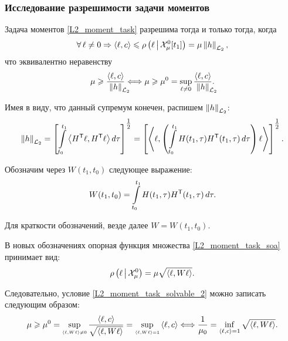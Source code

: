\subsubsection{Исследование разрешимости задачи моментов}

Задача моментов \eqref{L2_moment_task} разрешима тогда и только тогда, когда
\begin{equation}
\label{L2_moment_task_solvable_1}
  \forall \ell \neq 0 \Rightarrow
  \scalar{\ell}{c} \leqslant \sufu{\ell}{\soa_\mu^0[t_1]} =
  \mu \norm{h}_\LTwo,
\end{equation}
что эквивалентно неравенству
\begin{equation}
\label{L2_moment_task_solvable_2}
  \mu \geqslant
    \frac{\scalar{\ell}{c}}{\lefteqn{\norm{h}_\LTwo}\phantom{\norm{u}}} \Longleftrightarrow
  \mu \geqslant \mu^0 = \sup\limits_{\ell \neq 0}
    \frac{\scalar{\ell}{c}}{\lefteqn{\norm{h}_\LTwo}\phantom{\norm{u}}}.
\end{equation}

Имея в виду, что данный супремум конечен, распишем $\left\| h \right\|_{\mathcal{L}_2}$:
\begin{equation*}
	\left\| h \right\|_{\mathcal{L}_2} =
	\left[
	  \int\limits_{t_0}^{t_1} \left<H^{\mathsf{T}} \ell,H^{\mathsf{T}} \ell\right> d\tau
	\right]^{\tfrac{1}{2}} =
	\left[
	  \left<\ell,\left(
	    \int\limits_{t_0}^{t_1}H(t_1, \tau) H^{\mathsf{T}}(t_1, \tau) \, d\tau
	  \right) \ell\right>
	\right]^{\tfrac{1}{2}}.
\end{equation*}

Обозначим через $W(t_1, t_0)$ следующее выражение:
\begin{equation*}
	W(t_1, t_0) = \int\limits_{t_0}^{t_1} H(t_1, \tau) H^{\mathsf{T}}(t_1, \tau) \, d\tau.
\end{equation*}

\begin{note}
  Для краткости обозначений, везде далее $W = W(t_1, t_0)$.
\end{note}

В новых обозначениях опорная функция множества \eqref{L2_moment_task_soa} принимает вид:
\begin{equation}
\label{L2_moment_sufu_soa}
  \rho\left(\ell\,\middle|\,\mathcal{X}_\mu^0\right) = \mu \sqrt{\left<\ell,W \ell\right>}.
\end{equation}

Следовательно, условие \eqref{L2_moment_task_solvable_2} можно записать следующим образом:
\begin{equation}
\label{L2_moment_task_solvable_3}
  \mu \geqslant \mu^0 =
    \sup_{\scriptscriptstyle\left<\ell,W \ell\right> \neq 0}
      \frac{\left<\ell,c\right>}{\sqrt{\left<\ell,W \ell\right>}} =
    \sup_{\scriptscriptstyle\left<\ell,W \ell\right> = 1} \left<\ell,c\right> \Longleftrightarrow
  \frac{1}{\mu_0} = \inf_{\left<\ell,c\right> = 1} \sqrt{\left<\ell,W \ell\right>}.
\end{equation}

